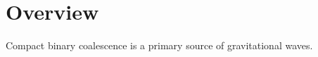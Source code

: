\chapter{Overview}
\label{chap:chapter-1}

Compact binary coalescence is a primary source of gravitational waves.
